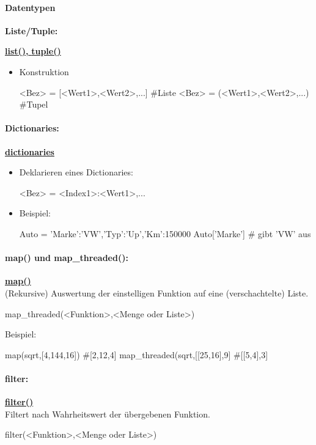 \documentclass[a4paper,9pt,DIV15,twocolumn]{scrartcl}
\begin{document}
\paragraph{Datentypen}
\textbf{Liste/Tuple:} 	{\href{http://docs.python.org/library/functions.html#list}{\textbf{list(),} } \href{http://docs.python.org/library/functions.html#tuple}{\textbf{tuple()}}
\begin{itemize}
 \item Konstruktion
\begin{sageinsmall}
<Bez> = [<Wert1>,<Wert2>,...] #Liste
<Bez> = (<Wert1>,<Wert2>,...) #Tupel
\end{sageinsmall}
\end{itemize}
\paragraph{Dictionaries:}		\href{http://docs.python.org/library/stdtypes.html?highlight=.update#mapping-types-dict}{\textbf{dictionaries}}
\begin{itemize}
 \item Deklarieren eines Dictionaries:
\begin{sageinsmall}
<Bez> = {<Index1>:<Wert1>,...}
\end{sageinsmall}
 \item Beispiel:
\begin{sageinsmall}
Auto = {'Marke':'VW','Typ':'Up','Km':150000}
Auto['Marke']		# gibt 'VW' aus
\end{sageinsmall}
\end{itemize}

\paragraph{map() und map\_threaded():} \href{https://sage.math.uni-goettingen.de/doc/static/reference/sage/combinat/generator.html?highlight=map#sage.combinat.generator.map}{\textbf{map()}}\\
(Rekursive) Auswertung der einstelligen Funktion auf eine (verschachtelte) Liste.
\begin{sageinsmall}
 map_threaded(<Funktion>,<Menge oder Liste>)
\end{sageinsmall}
Beispiel:
\begin{sageinsmall}
 map(sqrt,[4,144,16]) 			#[2,12,4]
 map_threaded(sqrt,[[25,16],9]	#[[5,4],3]
\end{sageinsmall}

\paragraph{filter:} \href{https://sage.math.uni-goettingen.de/doc/static/reference/sage/combinat/combinat.html?highlight=filter#sage.combinat.combinat.CombinatorialClass.filter}{\textbf{filter()}}\\
Filtert nach Wahrheitswert der übergebenen Funktion. 
\begin{sageinsmall}
filter(<Funktion>,<Menge oder Liste>)
\end{sageinsmall}

}
\end{document}
